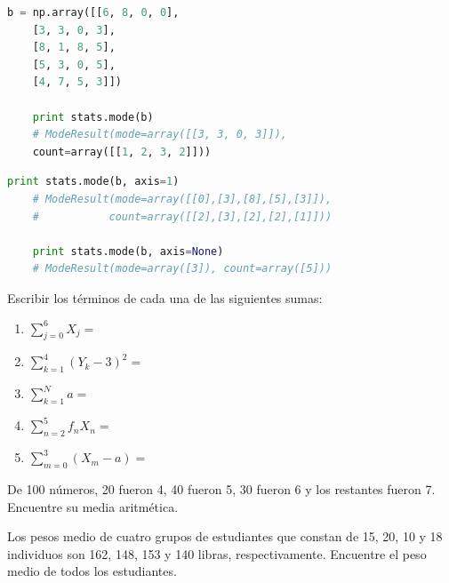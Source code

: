\begin{lstlisting}[language=Python]
	b = np.array([[6, 8, 0, 0],
	[3, 3, 0, 3],
	[8, 1, 8, 5],
	[5, 3, 0, 5],
	[4, 7, 5, 3]])
	
	print stats.mode(b)
	# ModeResult(mode=array([[3, 3, 0, 3]]),
	count=array([[1, 2, 3, 2]]))
\end{lstlisting}

\begin{lstlisting}[language=Python]
	print stats.mode(b, axis=1)
	# ModeResult(mode=array([[0],[3],[8],[5],[3]]),
	#           count=array([[2],[3],[2],[2],[1]]))
	
	print stats.mode(b, axis=None)
	# ModeResult(mode=array([3]), count=array([5]))
\end{lstlisting}

%
\begin{problema} \label{problema:3.1}
	Escribir los términos de cada una de las siguientes sumas:
	\begin{enumerate}
		\item $\displaystyle\sum_{j=0}^{6}X_{j}=$ 
		\item $\displaystyle\sum_{k=1}^{4}\left( Y_{k}-3 \right)^{2}=$ 
		\item $\displaystyle\sum_{k=1}^{N}a=$ 
		\item $\displaystyle\sum_{n=2}^{5}{f_{n}}X_{n}= $ 
		\item $\displaystyle\sum_{m=0}^{3}\left( X_{m}-a \right)=$
	\end{enumerate}
\end{problema}
%


\begin{problema}
	\label{problema:3.10}
	De 100 números, 20 fueron 4, 40 fueron 5, 30 fueron 6 y los restantes fueron 7. Encuentre su media aritmética.
\end{problema}




\begin{problema}
	\label{problema:3.13}
	Los pesos medio de cuatro grupos de estudiantes que constan de 15, 20, 10 y 18 individuos son 162, 148, 153 y 140 libras, respectivamente. Encuentre el peso medio de todos los estudiantes.
\end{problema}



%

